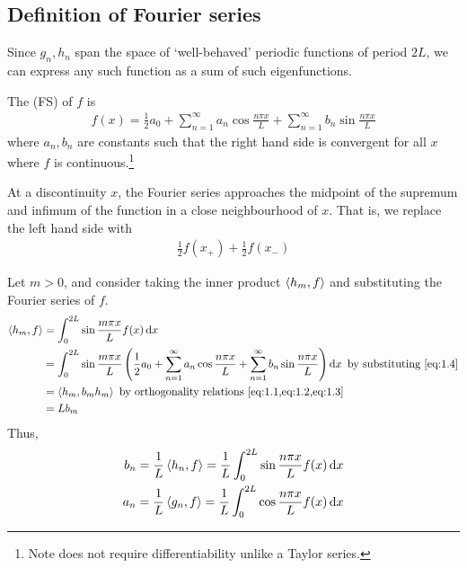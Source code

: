     \subsection{Definition of Fourier series}
    Since $g_n, h_n$ span the space of `well-behaved' periodic functions of period $2L$, we can express any such function as a sum of such eigenfunctions.
    \begin{definition}
        The  (FS) of $f$ is
        \begin{align} \label{eq:1.4}
            f(x) = \frac{1}{2}a_0 + \sum_{n=1}^\infty a_n \cos \frac{n \pi x}{L} + \sum_{n=1}^\infty b_n \sin \frac{n \pi x}{L}
        \end{align}
        where $a_n, b_n$ are constants such that the right hand side is convergent for all $x$ where $f$ is continuous.\footnote{Note does not require differentiability unlike a Taylor series.}
    \end{definition}
    At a discontinuity $x$, the Fourier series approaches the midpoint of the supremum and infimum of the function in a close neighbourhood of $x$.
    That is, we replace the left hand side with
    \begin{align*}
        \frac{1}{2}f(x_+) + \frac{1}{2}f(x_-)
    \end{align*}

    Let $m > 0$, and consider taking the inner product $\left\langle{h_m, f}\right\rangle$ and substituting the Fourier series of $f$.
    \begin{align*}
        \inner{h_m, f} &= \int_0^{2L} \sin\frac{m \pi x}{L} f(x) \dd{x} \\
        &= \int_0^{2L} \sin\frac{m \pi x}{L} \left( \frac{1}{2}a_0 + \sum_{n=1}^\infty a_n \cos \frac{n \pi x}{L} + \sum_{n=1}^\infty b_n \sin \frac{n \pi x}{L} \right) \dd{x} \text{ by substituting \cref{eq:1.4}}\\
        & = \inner{h_m, b_m h_m} \text{ by orthogonality relations \cref{eq:1.1,eq:1.2,eq:1.3}}\\
        & = L b_m
    \end{align*}
    Thus,
    \begin{equation}
        \begin{aligned}
        b_n = \frac{1}{L} \left\langle{h_n, f}\right\rangle = \frac{1}{L} \int_0^{2L} \sin\frac{n \pi x}{L} f(x) \dd{x} \\
        a_n = \frac{1}{L} \left\langle{g_n, f}\right\rangle = \frac{1}{L} \int_0^{2L} \cos\frac{n \pi x}{L} f(x) \dd{x}
        \end{aligned}
    \end{equation}

